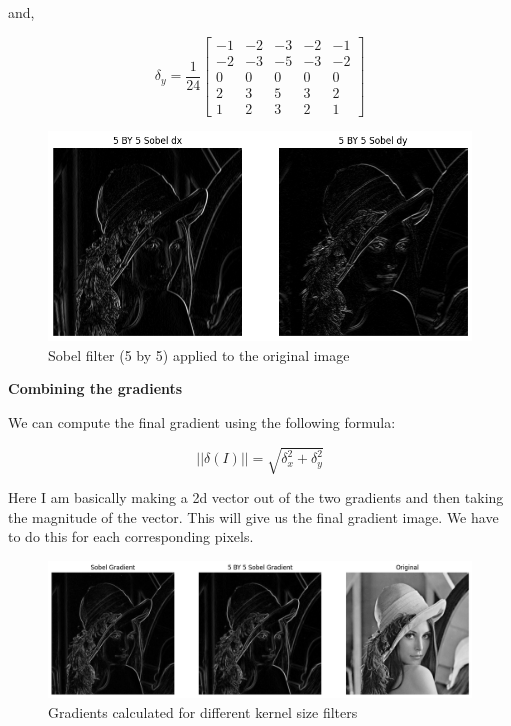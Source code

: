 and,

$$\delta_y = \frac{1}{24}
\begin{bmatrix}
-1 & -2 & -3 & -2 & -1 \\
-2 & -3 & -5 & -3 & -2 \\
0 & 0 & 0 & 0 & 0 \\
2 & 3 & 5 & 3 & 2 \\
1 & 2 & 3 & 2 & 1
\end{bmatrix}$$

\begin{figure}[H]
    \includegraphics[width=1.06\textwidth]{res/2a_5_by_5.png}
    \caption{Sobel filter (5 by 5) applied to the original image}
    \label{fig:2a_5by5}
\end{figure}


\textbf{Combining the gradients}

We can compute the final gradient using the following formula:

$$
||\delta(I)|| = \sqrt{\delta_x^2 + \delta_y^2}
$$

Here I am basically making a 2d vector out of the two gradients and then taking the magnitude of the vector. This will give us the final gradient image. We have to do this for each corresponding pixels.


\begin{figure}[H]
    \includegraphics[width=1.06\textwidth]{res/2a_gradient.png}
    \caption{Gradients calculated for different kernel size filters}
    \label{fig:2a_gradient}
\end{figure}

